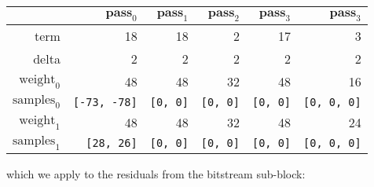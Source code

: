\begin{table}[h]
{
  \begin{tabular}{|r|r|r|r|r|r|}
    \hline
    & $\textbf{pass}_0$ & $\textbf{pass}_1$ & $\textbf{pass}_2$ &
    $\textbf{pass}_3$ & $\textbf{pass}_3$ \\
    \hline
    term & 18 & 18 & 2 & 17 & 3 \\
    delta & 2 & 2 & 2 & 2 & 2 \\
    $\text{weight}_0$ & 48 & 48 & 32 & 48 & 16 \\
    $\text{samples}_{0}$ & \texttt{[-73, -78]} & \texttt{[0, 0]} &
    \texttt{[0, 0]} & \texttt{[0, 0]} & \texttt{[0, 0, 0]} \\
    $\text{weight}_1$ & 48 & 48 & 32 & 48 & 24 \\
    $\text{samples}_{1}$ & \texttt{[28, 26]} & \texttt{[0, 0]} &
    \texttt{[0, 0]} & \texttt{[0, 0]} & \texttt{[0, 0, 0]} \\
    \hline
  \end{tabular}
}
\end{table}
\par
\noindent
which we apply to the residuals from the bitstream sub-block:
\par
\noindent
